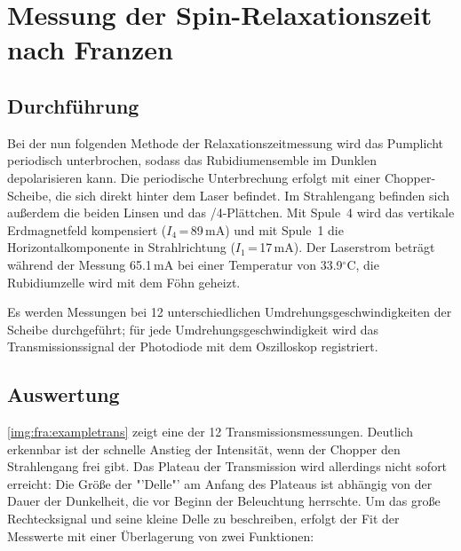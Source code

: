 \section{Messung der Spin-Relaxationszeit nach Franzen}
\subsection{Durchführung}
Bei der nun folgenden Methode der Relaxationszeitmessung wird das Pumplicht periodisch unterbrochen,
sodass das Rubidiumensemble im Dunklen depolarisieren kann.
Die periodische Unterbrechung erfolgt mit einer Chopper-Scheibe,
die sich direkt hinter dem Laser befindet.
Im Strahlengang befinden sich außerdem die beiden Linsen und das \textlambda/4-Plättchen.
Mit Spule~4 wird das vertikale Erdmagnetfeld kompensiert ($I_4$\,=\,89\,mA) und mit Spule~1 die
Horizontalkomponente in Strahlrichtung ($I_1$\,=\,17\,mA).
Der Laserstrom beträgt während der Messung 65.1\,mA bei einer Temperatur von 33.9$^\circ$C,
die Rubidiumzelle wird mit dem Föhn geheizt.

Es werden Messungen bei 12 unterschiedlichen Umdrehungsgeschwindigkeiten der Scheibe durchgeführt;
für jede Umdrehungsgeschwindigkeit wird das Transmissionssignal der Photodiode mit dem Oszilloskop registriert.

\subsection{Auswertung}

\autoref{img:fra:exampletrans} zeigt eine der 12 Transmissionsmessungen.
Deutlich erkennbar ist der schnelle Anstieg der Intensität, wenn der Chopper den Strahlengang frei gibt.
Das Plateau der Transmission wird allerdings nicht sofort erreicht:
Die Größe der "'Delle"' am Anfang des Plateaus ist abhängig von der Dauer der Dunkelheit,
die vor Beginn der Beleuchtung herrschte.
Um das große Rechtecksignal und seine kleine Delle zu beschreiben,
erfolgt der Fit der Messwerte mit einer Überlagerung von zwei Funktionen:

